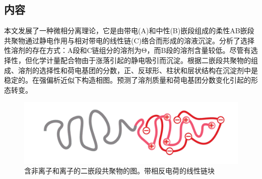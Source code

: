 \documentclass[12pt,a4paper]{article}
\numberwithin{equation}{section}
\begin{document}
\subsection{内容}
本文发展了一种微相分离理论，它是由带电(A)和中性(B)嵌段组成的柔性AB嵌段共聚物通过静电作用与相对带电的线性链(C)络合而形成的溶液沉淀。分析了选择性溶剂的存在方式：A段和C链组分的溶剂为Θ，而B段的溶剂含量较低。尽管有选择性，但化学计量配合物由于涨落引起的静电吸引而沉淀。根据二嵌段共聚物的组成、溶剂的选择性和荷电基团的分数，正、反球形、柱状和层状结构在沉淀剂中是稳定的。在强偏析近似下构造相图。预测了溶剂质量和荷电基团分数变化引起的形态转变。
\begin{figure}[H]
\centering
\includegraphics[scale=0.4]{./figures/9.png}
\caption{含非离子和离子的二嵌段共聚物的图。带相反电荷的线性链块}
\end{figure}
	
\end{document}
